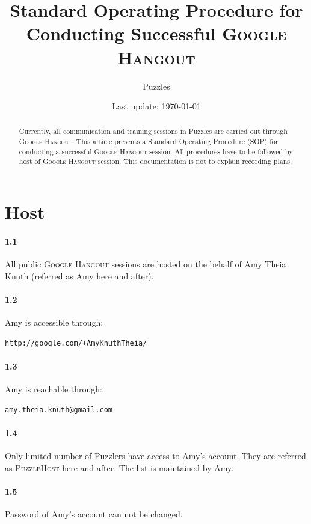\documentclass{article}
\title{\textbf{Standard Operating Procedure for Conducting Successful} \textsc{Google Hangout}}
\author{Puzzles}
\date{Last update: \today}
\newcommand{\hangout}{\textsc{Google Hangout}\xspace}
\newcommand{\host}{\textsc{PuzzleHost}\xspace}
\begin{document}
\maketitle

\begin{abstract}
Currently, all communication and training sessions in Puzzles are carried out through \hangout. This article presents a Standard Operating Procedure (SOP) for conducting a successful \hangout session. All procedures have to be followed by host of \hangout session. This documentation is not to explain recording plans.
\end{abstract}

\tableofcontents

\clearpage
\section{Host}

\paragraph{1.1} All public \hangout sessions are hosted on the behalf of Amy Theia Knuth (referred as Amy here and after).

\paragraph{1.2} Amy is accessible through:
\begin{verbatim}
http://google.com/+AmyKnuthTheia/
\end{verbatim}

\paragraph{1.3} Amy is reachable through:
\begin{verbatim}
amy.theia.knuth@gmail.com
\end{verbatim}

\paragraph{1.4} Only limited number of Puzzlers have access to Amy's account. They are referred as \host here and after. The list is maintained by Amy.

\paragraph{1.5} Password of Amy's account can not be changed.
\end{document}
